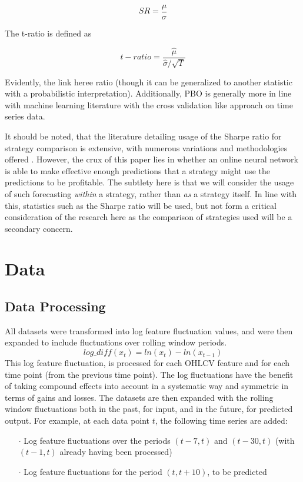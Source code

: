 \documentclass[a4paper,latin]{paper}
\begin{document}
\begin{equation}\label{SR}
  SR=\frac{\mu}{\sigma}
\end{equation}

The t-ratio is defined as 

\begin{equation}\label{tratio}
  t-ratio = \frac{\hat{\mu}}{\hat{\sigma}/\sqrt{T}}
\end{equation}

Evidently, the link heree ratio (though it can be generalized to another statistic with a probabilistic interpretation). Additionally, 
PBO is generally more in line with machine learning literature with the cross validation like approach on time series data.  
\hfill \break 

It should be noted, that the literature detailing usage of the Sharpe ratio for strategy comparison is extensive, with 
numerous variations and methodologies offered \cite{BaileySharpe}. However, the crux of this paper lies 
in whether an online neural network is able to make effective enough predictions that a strategy might use the 
predictions to be profitable. The subtlety here is that we will consider the usage of such forecasting \textit{within} a strategy,
 rather than \textit{as} a strategy itself. In line with this, statistics such as the Sharpe ratio will be used, but not form a critical 
 consideration of the research here as the comparison of strategies used will be a secondary concern.
\hfill \break 

\newpage


\section{Data}\label{Data}
\subsection{Data Processing}

All datasets were transformed into log feature fluctuation values, and were then expanded to include fluctuations over rolling window periods.
\begin{equation}
\textit{log\_diff}(x_t) = ln(x_t) - ln(x_{t-1})
\end{equation}
This log feature fluctuation,  is processed for each OHLCV feature and for each time point (from the previous time point). The log fluctuations have the benefit of taking compound effects into account in a systematic way and symmetric in terms of gains and losses.
\newline\newline
The datasets are then expanded with the rolling window fluctuations both in the past, for input, and in the future, for predicted output. For example, at each data point $t$, the following time series are added:
\begin{itemize}
	\item [$\cdot$] Log feature fluctuations over the periods $(t-7, t)$ and $(t-30, t)$ (with $(t-1, t)$ already having been processed)
	\item [$\cdot$] Log feature fluctuations for the period $(t, t + 10)$, to be predicted
\end{itemize}
\end{document}
